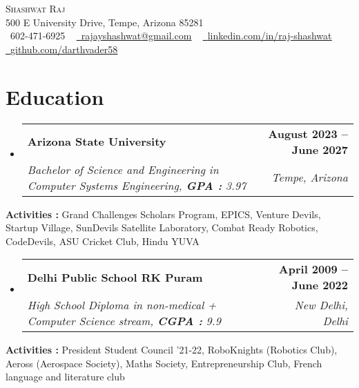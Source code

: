 \documentclass[letterpaper,11pt]{article}
\makeatletter
\newcommand{\resumeSubheading}[4]{
  \vspace{-2pt}\item
    \begin{tabular*}{1.0\textwidth}[t]{l@{\extracolsep{\fill}}r}
      \textbf{#1} & \textbf{\small #2} \\
      \textit{\small#3} & \textit{\small #4} \\
    \end{tabular*}\vspace{-7pt}
}
\newcommand{\resumeSubHeadingListStart}{\begin{itemize}[leftmargin=0.0in, label={}]}
\newcommand{\resumeSubHeadingListEnd}{\end{itemize}}
\makeatother
\begin{document}

\begin{center}
    {\Huge \scshape Shashwat Raj} \\ \vspace{1pt}
    500 E University Drive, Tempe, Arizona 85281 \\ \vspace{1pt}
    \small \raisebox{-0.1\height}\faPhone\ 602-471-6925 ~ \href{mailto:x@gmail.com}{\raisebox{-0.2\height}\faEnvelope\  \underline{rajayshashwat@gmail.com}} ~ 
    \href{https://linkedin.com/in//}{\raisebox{-0.2\height}\faLinkedin\ \underline{linkedin.com/in/raj-shashwat}}  ~
    \href{https://github.com/}{\raisebox{-0.2\height}\faGithub\ \underline{github.com/darthvader58}}
    \vspace{-8pt}
\end{center}


\section{Education}
  \resumeSubHeadingListStart
    \resumeSubheading
      {Arizona State University}{August 2023 -- June 2027}
      {Bachelor of Science and Engineering in Computer Systems Engineering, \textbf{GPA : }3.97}{Tempe, Arizona}
  \resumeSubHeadingListEnd
  \small
        {\textbf{Activities : } Grand Challenges Scholars Program, EPICS, Venture Devils, Startup Village, SunDevils Satellite Laboratory, Combat Ready Robotics, CodeDevils, ASU Cricket Club, Hindu YUVA}
  \resumeSubHeadingListStart
    \resumeSubheading
      {Delhi Public School RK Puram}{April 2009 -- June 2022}
      {High School Diploma in non-medical + Computer Science stream, \textbf{CGPA : }9.9}{New Delhi, Delhi}
  \resumeSubHeadingListEnd
  \small
        \vspace{2pt}
        {\textbf{Activities : }President Student Council '21-22, RoboKnights (Robotics Club), Aeross (Aerospace Society), Maths Society, Entrepreneurship Club, French language and literature club}
\vspace{-10pt}
\end{document}

